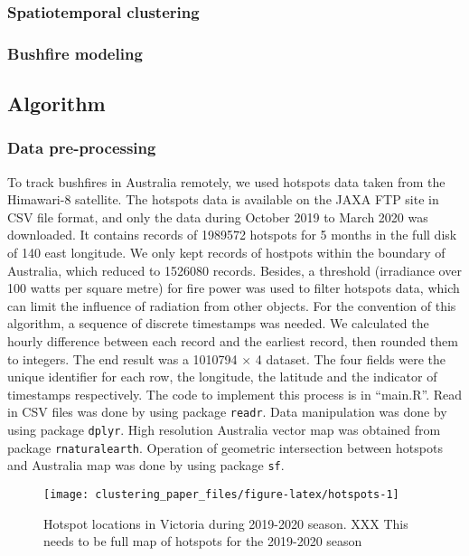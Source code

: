 \hypertarget{spatiotemporal-clustering}{%
\subsubsection{Spatiotemporal
clustering}\label{spatiotemporal-clustering}}

\hypertarget{bushfire-modeling}{%
\subsubsection{Bushfire modeling}\label{bushfire-modeling}}

\hypertarget{algorithm}{%
\subsection{Algorithm}\label{algorithm}}

\hypertarget{data-pre-processing}{%
\subsubsection{Data pre-processing}\label{data-pre-processing}}

To track bushfires in Australia remotely, we used hotspots data taken
from the Himawari-8 satellite. The hotspots data is available on the
JAXA FTP site in CSV file format, and only the data during October 2019
to March 2020 was downloaded. It contains records of 1989572 hotspots
for 5 months in the full disk of 140 \textdegree east longitude. We only
kept records of hostpots within the boundary of Australia, which reduced
to 1526080 records. Besides, a threshold (irradiance over 100 watts per
square metre) for fire power was used to filter hotspots data, which can
limit the influence of radiation from other objects. For the convention
of this algorithm, a sequence of discrete timestamps was needed. We
calculated the hourly difference between each record and the earliest
record, then rounded them to integers. The end result was a 1010794
\(\times\) 4 dataset. The four fields were the unique identifier for
each row, the longitude, the latitude and the indicator of timestamps
respectively. The code to implement this process is in ``main.R''. Read
in CSV files was done by using package \texttt{readr}. Data manipulation
was done by using package \texttt{dplyr}. High resolution Australia
vector map was obtained from package \texttt{rnaturalearth}. Operation
of geometric intersection between hotspots and Australia map was done by
using package \texttt{sf}.

\begin{Schunk}
\begin{figure}
\texttt{[image: clustering\_paper\_files/figure-latex/hotspots-1]} \caption[Hotspot locations in Victoria during 2019-2020 season]{Hotspot locations in Victoria during 2019-2020 season. XXX This needs to be full map of hotspots for the 2019-2020 season}\label{fig:hotspots}
\end{figure}
\end{Schunk}

